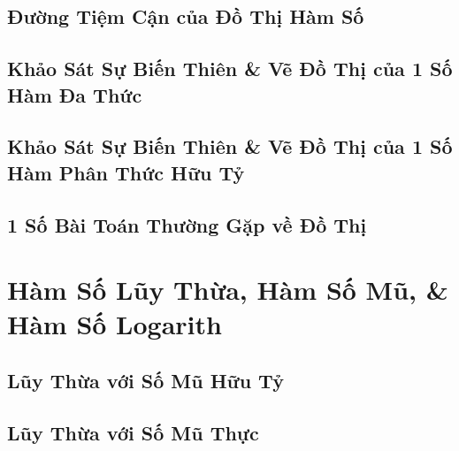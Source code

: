 \documentclass[oneside]{book}
\numberwithin{equation}{section}
\begin{document}

\section{Đường Tiệm Cận của Đồ Thị Hàm Số}


\section{Khảo Sát Sự Biến Thiên \& Vẽ Đồ Thị của 1 Số Hàm Đa Thức}


\section{Khảo Sát Sự Biến Thiên \& Vẽ Đồ Thị của 1 Số Hàm Phân Thức Hữu Tỷ}


\section{1 Số Bài Toán Thường Gặp về Đồ Thị}


\chapter{Hàm Số Lũy Thừa, Hàm Số Mũ, \& Hàm Số Logarith}

\section{Lũy Thừa với Số Mũ Hữu Tỷ}


\section{Lũy Thừa với Số Mũ Thực}

\end{document}
